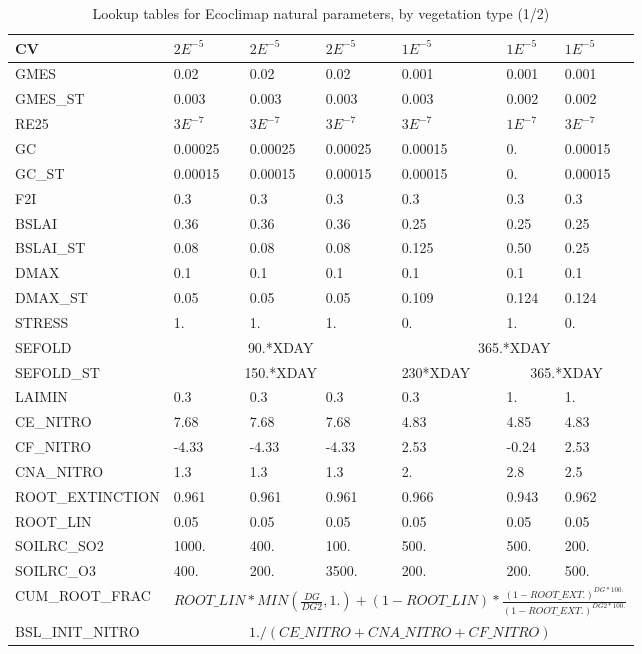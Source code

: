 \begin{table}[htbp]
\begin{center}
\begin{tabular}{|l|l|l|l|l|l|l| }
\hline
CV & $2E^{-5}$ & $2E^{-5}$ & $2E^{-5}$ & $1E^{-5}$ & $1E^{-5}$ & $1E^{-5}$ \\
\hline
GMES & 0.02 & 0.02 & 0.02 & 0.001 & 0.001 & 0.001\\
\hline
GMES\_ST & 0.003 & 0.003 & 0.003 & 0.003 & 0.002 & 0.002 \\
\hline
RE25 & $3E^{-7}$ & $3E^{-7}$ & $3E^{-7}$ & $3E^{-7}$ & $1E^{-7}$ & $3E^{-7}$ \\
\hline
GC & 0.00025 & 0.00025 & 0.00025 & 0.00015 & 0. & 0.00015 \\
\hline
GC\_ST & 0.00015 & 0.00015 & 0.00015 & 0.00015 & 0. & 0.00015\\
\hline
F2I & 0.3 & 0.3 & 0.3 & 0.3 & 0.3 & 0.3\\
\hline
BSLAI & 0.36 & 0.36 & 0.36 & 0.25 & 0.25 & 0.25 \\ 
\hline
BSLAI\_ST & 0.08 & 0.08 & 0.08 & 0.125 & 0.50 & 0.25 \\
\hline
DMAX & 0.1 & 0.1 & 0.1 & 0.1 & 0.1 & 0.1  \\
\hline
DMAX\_ST & 0.05 & 0.05 & 0.05 & 0.109 & 0.124 & 0.124 \\
\hline
STRESS & 1. & 1. & 1. & 0. & 1. & 0. \\
\hline
SEFOLD & \multicolumn{3}{|c|}{90.*XDAY} & \multicolumn{3}{|c|}{365.*XDAY} \\
\hline
SEFOLD\_ST & \multicolumn{3}{|c|}{150.*XDAY} & 230*XDAY & \multicolumn{2}{|c|}{365.*XDAY}    \\
\hline
LAIMIN & 0.3 & 0.3 & 0.3 & 0.3 & 1. & 1.  \\ 
\hline
CE\_NITRO & 7.68 & 7.68 & 7.68 & 4.83 & 4.85 & 4.83 \\
\hline
CF\_NITRO & -4.33 & -4.33 & -4.33 & 2.53 & -0.24 & 2.53 \\
\hline
CNA\_NITRO & 1.3 & 1.3 & 1.3 & 2. & 2.8 & 2.5  \\
\hline
ROOT\_EXTINCTION & 0.961 & 0.961 & 0.961 & 0.966 & 0.943 & 0.962 \\
\hline
ROOT\_LIN & 0.05 & 0.05 & 0.05 & 0.05 & 0.05 & 0.05 \\
\hline
SOILRC\_SO2 & 1000. & 400. & 100. & 500. & 500. & 200. \\
\hline
SOILRC\_O3 & 400. & 200. & 3500. & 200. & 200. & 500.  \\
\hline
CUM\_ROOT\_FRAC & \multicolumn{6}{|c|}{$ROOT\_LIN*MIN(\frac{DG}{DG2},1.)+(1-ROOT\_LIN)*\frac{(1-ROOT\_EXT.)^{DG*100.}}{(1-ROOT\_EXT.)^{DG2*100.}}$} \\
\hline
BSL\_INIT\_NITRO & \multicolumn{6}{|c|}{$1./(CE\_NITRO+CNA\_NITRO+CF\_NITRO)$} \\
\hline
\end{tabular}
\end{center}
\caption{Lookup tables for Ecoclimap natural parameters, by vegetation type (1/2)}
\label{tab4a}
\end{table}

